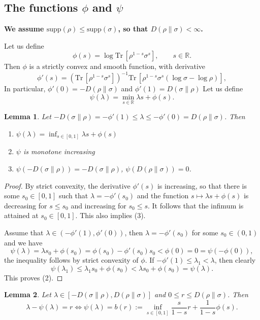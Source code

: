 \documentclass[12pt]{article}
\newtheorem{lemma}{Lemma}
\theoremstyle{definition}
\theoremstyle{remark}
\def \Tr{\mathrm{Tr}\,}
\def\supp{\mathrm{supp}}
\begin{document}
\subsection{The functions $\phi$ and $\psi$}

\textbf{We assume $\supp(\rho)\le \supp(\sigma)$, so that $D(\rho\|\sigma)<\infty$.}

Let us define 
\[
\phi(s)=\log \Tr[\rho^{1-s}\sigma^s],\qquad s\in \mathbb R.
\]
Then $\phi$ is a strictly convex and smooth function, with derivative
\[
\phi'(s)=(\Tr[\rho^{1-s}\sigma^s])^{-1}\Tr[\rho^{1-s}\sigma^s(\log\sigma-\log\rho)],
\]
\cite[Exercise 3.5]{hayashi2017quantum}
In particular,  $\phi'(0)=-D(\rho\|\sigma)$ and $\phi'(1)=D(\sigma\|\rho)$  Let us define
\[
\psi(\lambda)=\min_{s\in \mathbb R} \lambda s+\phi(s).
\]

\begin{lemma}\label{lemma:phipsi} Let $-D(\sigma\|\rho)=-\phi'(1)\le \lambda\le
-\phi'(0)=D(\rho\|\sigma)$. Then 
\begin{enumerate} 

\item $\psi(\lambda)=\inf_{s\in[0,1]} \lambda s+\phi(s)$
\item $\psi$ is monotone increasing
\item $\psi(-D(\sigma\|\rho))=-D(\sigma\|\rho)$,
$\psi(D(\rho\|\sigma))=0$.

\end{enumerate}


\end{lemma}

\begin{proof} 
By strict convexity,  the derivative $\phi'(s)$ is increasing, so that there is some
$s_0\in [0,1]$ such that $\lambda=-\phi'(s_0)$ and the function $s\mapsto \lambda
s+\phi(s)$ is decreasing for $s\le s_0$ and increasing for $s_0\le s$. It follows that the
infimum is attained at $s_0\in [0,1]$. This also implies (3). 

Assume that $\lambda\in (-\phi'(1),\phi'(0))$, then $\lambda=-\phi'(s_0)$ for some
$s_0\in (0,1)$  and we have  
\[
\psi(\lambda)=\lambda s_0+\phi(s_0)=\phi(s_0)-\phi'(s_0)s_0<\phi(0)=0=\psi(-\phi(0)),
\]
the inequality follows by strict convexity of $\phi$. If $-\phi'(1)\le \lambda_1<\lambda$,
then clearly
\[
\psi(\lambda_1)\le \lambda_1s_0+\phi(s_0)<\lambda s_0+\phi(s_0)=\psi(\lambda).
\]
This proves (2).
\end{proof}

\begin{lemma}\label{lemma:psib}
Let  $\lambda\in [-D(\sigma\|\rho),D(\rho\|\sigma)]$ and $0\le r\le D(\rho\|\sigma)$. Then 
\[
\lambda-\psi(\lambda)=r \iff \psi(\lambda)=b(r):=\inf_{s\in[0,1]}
\frac{s}{1-s}r+\frac1{1-s}\phi(s).
\]
\end{lemma}
\end{document}
